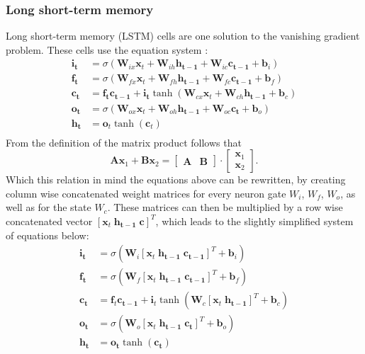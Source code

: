 \subsubsection{Long short-term memory}
Long short-term memory (LSTM) cells are one solution to the vanishing gradient problem.
These cells use the equation system \cite[page 5]{Graves2013}:
\begin{align}
\mathbf{i_t} &= \sigma (\mathbf{W}_{ix} \mathbf{x}_t + \mathbf{W}_{ih} \mathbf{h_{t-1}} + \mathbf{W}_{ic} \mathbf{c_{t-1}} +\mathbf{ b}_i) \\
\mathbf{f_t} &= \sigma (\mathbf{W}_{fx} \mathbf{x}_t + \mathbf{W}_{fh} \mathbf{h_{t-1}} + \mathbf{W}_{fc} \mathbf{c_{t-1}} +\mathbf{ b}_f) \\
\mathbf{c_t} &= \mathbf{f_t} \mathbf{c_{t-1}} + \mathbf{i_t} \tanh( \mathbf{W}_{cx} \mathbf{x}_t + \mathbf{W}_{ch} \mathbf{h_{t-1}} + \mathbf{b}_c ) \\
\mathbf{o_t} &= \sigma (\mathbf{W}_{ox} \mathbf{x}_t + \mathbf{W}_{oh} \mathbf{h_{t-1}} + \mathbf{W}_{oc} \mathbf{c_t} + \mathbf{b}_o ) \\
\mathbf{h_t} &= \mathbf{o}_t \tanh(\mathbf{c}_t) \\
\end{align}
From the definition of the matrix product follows that
\begin{equation}
\mathbf{A}\mathbf{x}_1 + \mathbf{B}\mathbf{x}_2
=
\begin{bmatrix} \mathbf{A} & \mathbf{B} \end{bmatrix} \cdot
\begin{bmatrix} \mathbf{x}_1 \\ \mathbf{x}_2 \end{bmatrix}.
\end{equation}
Which this relation in mind the equations above can be rewritten, by creating column wise concatenated weight matrices for every neuron gate $W_i$, $W_f$, $W_o$, as well as for the state $W_c$. These matrices can then be multiplied by a row wise concatenated vector $[\mathbf{x}_t \; \mathbf{h_{t-1}} \; \mathbf{c}]^T$, which leads to the slightly simplified system of equations below:
\begin{align}
\mathbf{i_t} &= \sigma (\mathbf{W}_i [\mathbf{x}_t \; \mathbf{h_{t-1}} \; \mathbf{c_{t-1}}]^T + \mathbf{b}_i) \\
\mathbf{f_t} &= \sigma (\mathbf{W}_f [\mathbf{x}_t \; \mathbf{h_{t-1}} \; \mathbf{c_{t-1}}]^T + \mathbf{b}_f) \\
\mathbf{c_t} &= \mathbf{f}_t \mathbf{c_{t-1}} + \mathbf{i}_t \tanh( \mathbf{W}_c [\mathbf{x}_t \; \mathbf{h_{t-1}}]^T + \mathbf{b}_c ) \\
\mathbf{o_t} &= \sigma (\mathbf{W}_o [\mathbf{x}_t \; \mathbf{h_{t-1}} \; \mathbf{c_t}]^T + \mathbf{b}_o ) \\
\mathbf{h_t} &= \mathbf{o_t} \tanh(\mathbf{c_t})
\end{align}
